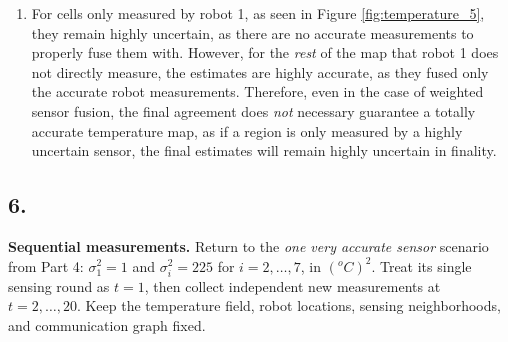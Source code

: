 \documentclass[12pt]{article}
\begin{document}
\begin{enumerate}[label=(\alph*)]
    Let us call $\sum_{i=2}^{n_{rc}}\sigma_i^2=a>0$ and compare the relative size. If we want the addition of robot 1 to decrease the uncertainty, then we need to satisfy the ratio:
    \begin{align*}
        \frac{\text{Var}(\hat\theta_{rc}^w)}{\text{Var}^*(\hat\theta_{rc}^u)}&<1\\
        \frac{\frac{\sigma_1^2+a}{n_{rc}^2}}{\frac{a}{(n_{rc}-1)^2}}&<1\\
        \frac{(\sigma_1^2+a)(n_{rc}-1)^2}{an_{rc}^2}&<1\\
        \frac{\sigma_1^2+a}{a}<\frac{n_{rc}^2}{(n_{rc}-1)^2},
    \end{align*}
    which shows that adding a measurement with uncertainty $\sigma_1^2$ only \textit{improves} the overall uncertainty if it is sufficiently small such that the ratio is less than $\frac{n_{rc}^2}{(n_{rc}-1)^2}$. In the case of this example, when $\sigma_1^2=255\ (^oC)^2$, the ratio is violated as, in the best case for $n_{rc}=2$, we have,
    \begin{align*}
        \frac{255+1}{1}\nless\frac{4}{1}.
    \end{align*}

    \item For cells only measured by robot 1, as seen in Figure \ref{fig:temperature_5}, they remain highly uncertain, as there are no accurate measurements to properly fuse them with. However, for the \textit{rest} of the map that robot 1 does not directly measure, the estimates are highly accurate, as they fused only the accurate robot measurements. Therefore, even in the case of weighted sensor fusion, the final agreement does \textit{not} necessary guarantee a totally accurate temperature map, as if a region is only measured by a highly uncertain sensor, the final estimates will remain highly uncertain in finality.
\end{enumerate}

\clearpage
\subsection*{6.}
\textbf{Sequential measurements.}
Return to the \textit{one very accurate sensor} scenario from Part 4: $\sigma_1^2=1$ and $\sigma_i^2=225$ for $i=2,\dots,7$, in $(^oC)^2$. Treat its single sensing round as $t=1$, then collect independent new measurements at $t=2,\dots,20$. Keep the temperature field, robot locations, sensing neighborhoods, and communication graph fixed.
\end{document}
